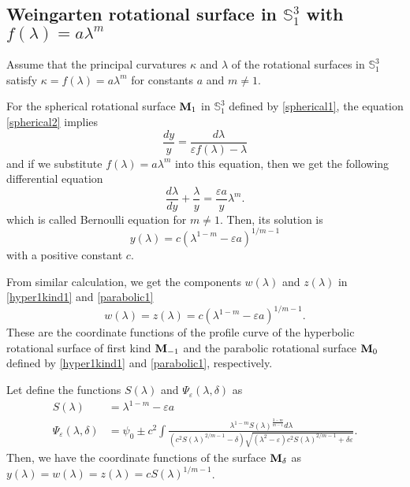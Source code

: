 \documentclass{amsart}
\theoremstyle{definition}
\numberwithin{equation}{section}
\begin{document}
\subsection{Weingarten rotational surface in $\mathbb{S}^3_1$ with $f(\lambda)=a\lambda^m$}
Assume that the principal curvatures $\kappa$ and $\lambda$
of the rotational surfaces in $\mathbb{S}^3_1$ satisfy 
$\kappa=f(\lambda)=a\lambda^m$ for constants $a$ and $m\neq 1$. 

For the spherical rotational surface ${\bf M}_1$ in $\mathbb{S}^3_1$ defined by \eqref{spherical1}, 
the equation \eqref{spherical2} implies 
\begin{equation}
  \frac{dy}{y}=
  \frac{d\lambda}{\varepsilon f(\lambda)-\lambda}
\end{equation}
and if we substitute $f(\lambda)=a\lambda^m$ into this equation,
then we get the following differential equation
\begin{equation}
    \frac{d\lambda}{dy}+\frac{\lambda}{y}=\frac{\varepsilon a}{y}\lambda^m.
\end{equation}
which is called  Bernoulli equation for $m\neq 1$. 
Then, its solution is 
\begin{equation}
    \label{spherical16}
    y(\lambda)=c(\lambda^{1-m}-\varepsilon a)^{1/{m-1}}
\end{equation}
with a positive constant $c$. 

From similar calculation, we get the components $w(\lambda)$ and $z(\lambda)$
in \eqref{hyper1kind1} and \eqref{parabolic1}
\begin{equation}
    \label{spherical161}
    w(\lambda)=z(\lambda)=c(\lambda^{1-m}-\varepsilon a)^{1/{m-1}}.
\end{equation}
These are the coordinate functions of the profile curve of 
the hyperbolic rotational surface of first kind ${\bf M}_{-1}$ and 
the parabolic rotational surface ${\bf M}_0$ defined by \eqref{hyper1kind1} 
and \eqref{parabolic1}, respectively.

Let define the functions $S(\lambda)$ and $\Psi_{\varepsilon}(\lambda,\delta)$
as 
\begin{align}
\label{eqA}
S(\lambda)&=\lambda^{1-m}-\varepsilon a\\
    \label{eq2}
    \Psi_{\varepsilon}(\lambda,\delta)&=\psi_0\pm c^2\int{\frac{\lambda^{1-m}S(\lambda)^{\frac{3-m}{m-1}}d\lambda}
    {(c^2 S(\lambda)^{2/{m-1}}-\delta)\sqrt{(\lambda^2-\varepsilon)c^2
    S(\lambda)^{2/{m-1}}+\delta\varepsilon}}}.
\end{align}
Then, we have the coordinate functions of the surface ${\bf M}_\delta$ as 
$y(\lambda)=w(\lambda)=z(\lambda)=cS(\lambda)^{1/m-1}$.
\end{document}
